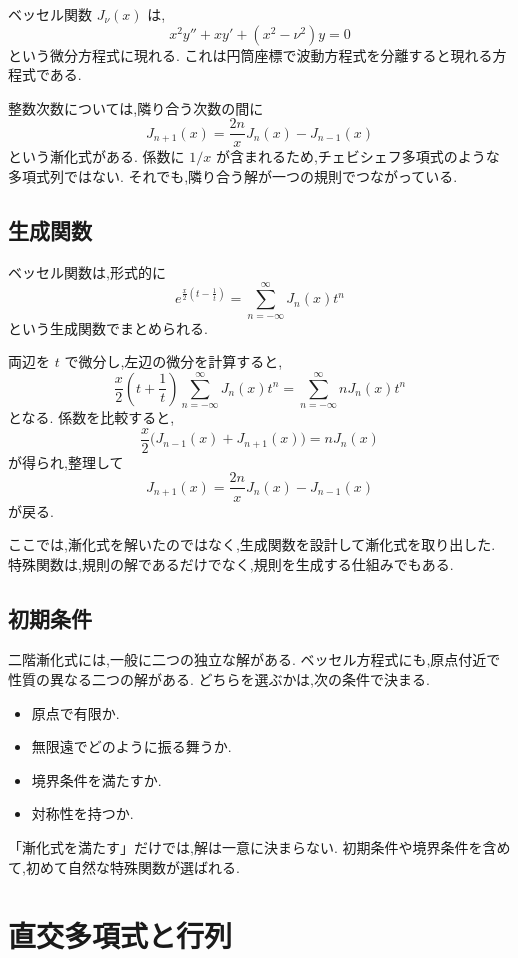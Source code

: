 ベッセル関数 $J_\nu(x)$ は,
\[
  x^2y''+xy'+(x^2-\nu^2)y=0
\]
という微分方程式に現れる.
これは円筒座標で波動方程式を分離すると現れる方程式である.

整数次数については,隣り合う次数の間に
\[
  J_{n+1}(x)
  =\frac{2n}{x}J_n(x)-J_{n-1}(x)
\]
という漸化式がある.
係数に $1/x$ が含まれるため,チェビシェフ多項式のような多項式列ではない.
それでも,隣り合う解が一つの規則でつながっている.

\subsection{生成関数}

ベッセル関数は,形式的に
\[
  e^{\frac{x}{2}\left(t-\frac1t\right)}
  =\sum_{n=-\infty}^{\infty}J_n(x)t^n
\]
という生成関数でまとめられる.

両辺を $t$ で微分し,左辺の微分を計算すると,
\[
  \frac{x}{2}\left(t+\frac1t\right)
  \sum_{n=-\infty}^{\infty}J_n(x)t^n
  =
  \sum_{n=-\infty}^{\infty}nJ_n(x)t^n
\]
となる.
係数を比較すると,
\[
  \frac{x}{2}\bigl(J_{n-1}(x)+J_{n+1}(x)\bigr)
  =nJ_n(x)
\]
が得られ,整理して
\[
  J_{n+1}(x)=\frac{2n}{x}J_n(x)-J_{n-1}(x)
\]
が戻る.

ここでは,漸化式を解いたのではなく,生成関数を設計して漸化式を取り出した.
特殊関数は,規則の解であるだけでなく,規則を生成する仕組みでもある.

\subsection{初期条件}

二階漸化式には,一般に二つの独立な解がある.
ベッセル方程式にも,原点付近で性質の異なる二つの解がある.
どちらを選ぶかは,次の条件で決まる.

\begin{itemize}
  \item 原点で有限か.
  \item 無限遠でどのように振る舞うか.
  \item 境界条件を満たすか.
  \item 対称性を持つか.
\end{itemize}

「漸化式を満たす」だけでは,解は一意に決まらない.
初期条件や境界条件を含めて,初めて自然な特殊関数が選ばれる.

\section{直交多項式と行列}

